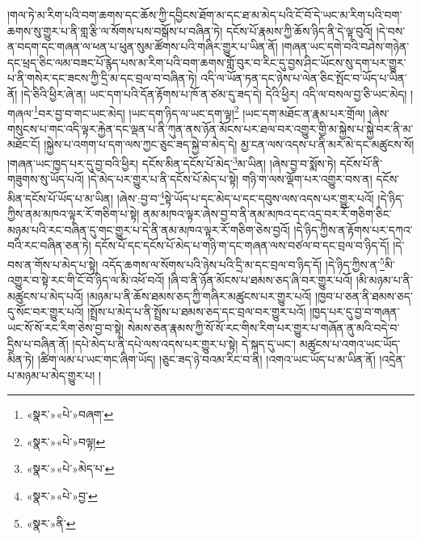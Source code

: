 །གལ་ཏེ་མ་རིག་པའི་བག་ཆགས་དང་ཆོས་ཀྱི་དབྱིངས་ཐོག་མ་དང་ཐ་མ་མེད་པའི་ངོ་བོ་དེ་ཡང་མ་རིག་པའི་བག་ཆགས་སུ་གྱུར་པ་ནི་གླ་རྩི་ལ་སོགས་པས་བསྒོས་པ་བཞིན་ཏེ། དངོས་པོ་རྣམས་ཀྱི་ཆོས་ཉིད་ནི་དེ་ལྟ་བུའོ། །དེ་བས་ན་བདག་དང་གཞན་ལ་ཕན་པ་ཕུན་སུམ་ཚོགས་པའི་གཞིར་གྱུར་པ་ཡིན་ནོ། །གཞན་ཡང་དགེ་བའི་བཤེས་གཉེན་དང་ཕྲད་ཅིང་ལམ་བཟང་པོ་རྙེད་པས་མ་རིག་པའི་བག་ཆགས་གློ་བུར་བ་རིང་དུ་བྱས་ཤིང་ཡོངས་སུ་དག་པར་གྱུར་པ་ནི་གསེར་དང་ཟངས་ཀྱི་དྲི་མ་དང་བྲལ་བ་བཞིན་ཏེ། འདི་ལ་ཡོན་ཏན་དང་ཉེས་པ་ལེན་ཅིང་སྤོང་བ་ཡོད་པ་ཡིན་ནོ། །དེ་ཅིའི་ཕྱིར་ཞེ་ན། ཡང་དག་པའི་དོན་རྟོགས་པ་ཁོ་ན་ཙམ་དུ་ཟད་དེ། དེའི་ཕྱིར། འདི་ལ་བསལ་བྱ་ཅི་ཡང་མེད། །གཞལ་\footnote{«སྣར་»«པེ་»བཞག་}བར་བྱ་བ་གང་ཡང་མེད། །ཡང་དག་ཉིད་ལ་ཡང་དག་ལྟ།\footnote{«སྣར་»«པེ་»བལྟ།} །ཡང་དག་མཐོང་ན་རྣམ་པར་གྲོལ། །ཞེས་གསུངས་པ་གང་འདི་ལྟར་རྐྱེན་དང་ལྡན་པ་ནི་ཀུན་ནས་ཉོན་མོངས་པར་ཐལ་བར་འགྱུར་གྱི་མ་སྐྱེས་པ་སྐྱེ་བར་ནི་མ་མཐོང་ངོ། །སྐྱེས་པ་འགག་པ་དག་ལས་ཀྱང་ཅུང་ཟད་སྐྱེ་བ་མེད་དེ། མྱ་ངན་ལས་འདས་པ་ནི་མར་མེ་དང་མཚུངས་སོ། །གཞན་ཡང་ཁྱད་པར་དུ་བྱ་བའི་ཕྱིར། དངོས་མིན་དངོས་པོ་མེད་\footnote{«སྣར་»«པེ་»མེད་པ་}མ་ཡིན། །ཞེས་བྱ་བ་སྨོས་ཏེ། དངོས་པོ་ནི་གཟུགས་སུ་ཡོད་པའོ། །དེ་མེད་པར་གྱུར་པ་ནི་དངོས་པོ་མེད་པ་སྟེ། གཉི་ག་ལས་ལྡོག་པར་འགྱུར་བས་ན། དངོས་མིན་དངོས་པོ་ཡོད་པ་མ་ཡིན། །ཞེས་:བྱ་བ་\footnote{«སྣར་»«པེ་»བྱ་}སྟེ་ཡོད་པ་དང་མེད་པ་དང་དབུས་ལས་འདས་པར་གྱུར་པའོ། །དེ་ཉིད་ཀྱིས་ནམ་མཁའ་ལྟར་རོ་གཅིག་པ་སྟེ། ནམ་མཁའ་ལྟར་ཞེས་བྱ་བ་ནི་ནམ་མཁའ་དང་འདྲ་བར་རོ་གཅིག་ཅིང་མཉམ་པའི་རང་བཞིན་དུ་གང་གྱུར་པ་དེ་ནི་ནམ་མཁའ་ལྟར་རོ་གཅིག་ཅེས་བྱའོ། །དེ་ཉིད་ཀྱིས་ན་རྟོགས་པར་དཀའ་བའི་རང་བཞིན་ཅན་ཏེ། དངོས་པོ་དང་དངོས་པོ་མེད་པ་གཉི་ག་དང་གཞན་ལས་བཙལ་བ་དང་བྲལ་བ་ཉིད་དོ། །དེ་བས་ན་གོས་པ་མེད་པ་སྟེ། འདོད་ཆགས་ལ་སོགས་པའི་ཉེས་པའི་དྲི་མ་དང་བྲལ་བ་ཉིད་དོ། །དེ་ཉིད་ཀྱིས་ན་\footnote{«སྣར་»ནི་}མི་འགྱུར་བ་སྟེ་རང་གི་ངོ་བོ་ཉིད་ལ་མི་འཕོ་བའོ། །ཞི་བ་ནི་ཉོན་མོངས་པ་ཐམས་ཅད་ཞི་བར་གྱུར་པའོ། །མི་མཉམ་པ་ནི་མཚུངས་པ་མེད་པའོ། །མཉམ་པ་ནི་ཆོས་ཐམས་ཅད་ཀྱི་གཞིར་མཚུངས་པར་གྱུར་པའོ། །ཁྱབ་པ་ཅན་ནི་ཐམས་ཅད་དུ་སོང་བར་གྱུར་པའོ། །སྤྲོས་པ་མེད་པ་ནི་སྤྲོས་པ་ཐམས་ཅད་དང་བྲལ་བར་གྱུར་པའོ། །ཁྱད་པར་དུ་བྱ་བ་གཞན་ཡང་སོ་སོ་རང་རིག་ཅེས་བྱ་བ་སྟེ། སེམས་ཅན་རྣམས་ཀྱི་སོ་སོ་རང་གིས་རིག་པར་གྱུར་པ་གཞོན་ནུ་མའི་བདེ་བ་དྲིས་པ་བཞིན་ནོ། །དཔེ་མེད་པ་ནི་དཔེ་ལས་འདས་པར་གྱུར་པ་སྟེ། དེ་སྐད་དུ་ཡང་། མཚུངས་པ་འགའ་ཡང་ཡོད་མིན་ཏེ། །ཚིག་ལམ་པ་ཡང་གང་ཞིག་ཡོད། །ཅུང་ཟད་ཉེ་བའམ་རིང་བ་ནི། །འགའ་ཡང་ཡོད་པ་མ་ཡིན་ནོ། །འདྲེན་པ་མཉམ་པ་མེད་གྱུར་པ། །
